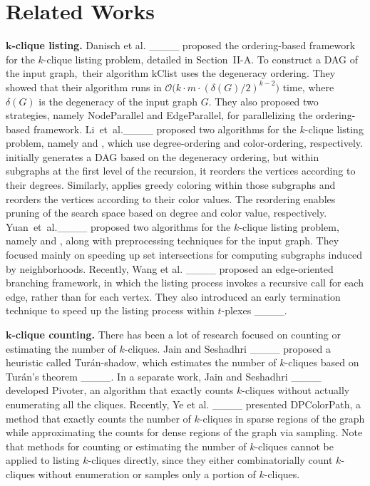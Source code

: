 \section{Related Works}
\noindent
\textbf{$\bm{k}$-clique listing.}
Danisch et al. ____ proposed the ordering-based framework for the $k$-clique listing problem, detailed in Section~II-A.
To construct a DAG of the input graph,~their algorithm \textsf{kClist} uses the degeneracy ordering.
They showed that their algorithm runs in $\mathcal{O}\big(k\cdot m\cdot (\delta(G)/2)^{k-2} \big)$ time, where $\delta(G)$ is the degeneracy of the input graph $G$.
They also proposed two strategies, namely \textsf{NodeParallel} and \textsf{EdgeParallel}, for parallelizing the ordering-based framework.
Li~et~al.____ proposed two algorithms for the $k$-clique listing problem, namely \DDegree and \DDegCol, which use degree-ordering and color-ordering, respectively.
\DDegree initially generates a DAG based on the degeneracy ordering, but within subgraphs at the first level of the recursion, it reorders the vertices according to their degrees.
Similarly, \DDegCol applies greedy coloring within those subgraphs and reorders the vertices according to their color values.
The reordering enables pruning of the search space based on degree and color value, respectively.
Yuan~et~al.____ proposed two algorithms for the $k$-clique listing problem, namely \SDegree and \BitCol, along with preprocessing techniques for the input graph.
They focused mainly on speeding up set intersections for computing subgraphs induced by neighborhoods.
Recently, Wang et al. ____ proposed an edge-oriented branching framework, in which the listing process invokes a recursive call for each edge, rather than for each vertex.
They also introduced an early termination technique to speed up the listing process within $t$-plexes ____.

\noindent
\textbf{$\bm{k}$-clique counting.}
There has been a lot of research focused on counting or estimating the number of $k$-cliques.
Jain and Seshadhri ____ proposed a heuristic called \textsf{Tur{\'a}n-shadow}, which estimates the number of $k$-cliques based on Tur{\'a}n's theorem ____.
In a separate work, Jain and Seshadhri ____ developed \textsf{Pivoter}, an algorithm that exactly counts $k$-cliques without actually enumerating all the cliques.
Recently, Ye et al. ____ presented \textsf{DPColorPath}, a method that exactly counts the number of $k$-cliques in sparse regions of the graph while approximating the counts for dense regions of the graph via sampling. 
Note that methods for counting or estimating the number of $k$-cliques cannot be applied to listing $k$-cliques directly, since they either combinatorially count $k$-cliques without enumeration or samples only a portion of $k$-cliques.

